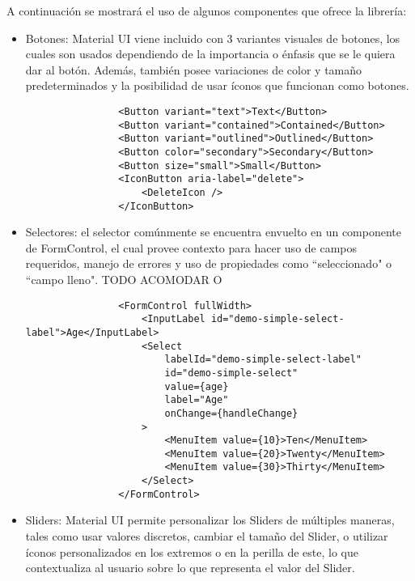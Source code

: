 A continuación se mostrará el uso de algunos componentes que ofrece la librería:

\begin{itemize}
  \item Botones: Material UI viene incluido con 3 variantes visuales de botones, los cuales son usados dependiendo de la importancia o énfasis que se le quiera dar al botón. Además, también posee variaciones de color y tamaño predeterminados y la posibilidad de usar íconos que funcionan como botones.

        \begin{lstlisting}
                <Button variant="text">Text</Button>
                <Button variant="contained">Contained</Button>
                <Button variant="outlined">Outlined</Button>
                <Button color="secondary">Secondary</Button>
                <Button size="small">Small</Button>
                <IconButton aria-label="delete">
                    <DeleteIcon />
                </IconButton>
            \end{lstlisting}



  \item Selectores: el selector comúnmente se encuentra envuelto en un componente de FormControl, el cual provee contexto para hacer uso de campos requeridos, manejo de errores y uso de propiedades como ``seleccionado" o ``campo lleno".  TODO ACOMODAR O

        \begin{lstlisting}
                <FormControl fullWidth>
                    <InputLabel id="demo-simple-select-label">Age</InputLabel>
                    <Select
                        labelId="demo-simple-select-label"
                        id="demo-simple-select"
                        value={age}
                        label="Age"
                        onChange={handleChange}
                    >
                        <MenuItem value={10}>Ten</MenuItem>
                        <MenuItem value={20}>Twenty</MenuItem>
                        <MenuItem value={30}>Thirty</MenuItem>
                    </Select>
                </FormControl>
            \end{lstlisting}



  \item Sliders: Material UI permite personalizar los Sliders de múltiples maneras, tales como usar valores discretos, cambiar el tamaño del Slider, o utilizar íconos personalizados en los extremos o en la perilla de este, lo que contextualiza al usuario sobre lo que representa el valor del Slider.


\end{itemize}
